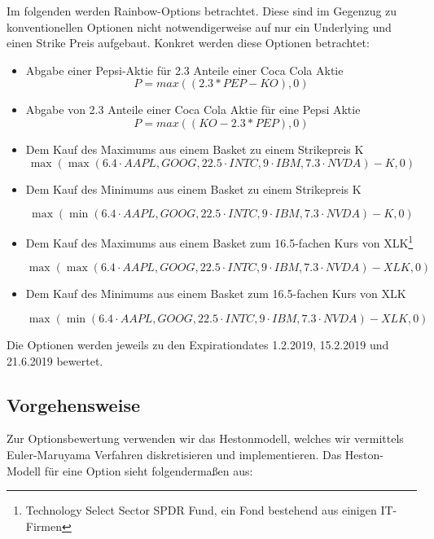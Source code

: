 \documentclass[12pt]{article}
\begin{document}
Im folgenden werden Rainbow-Options betrachtet. Diese sind im Gegenzug zu konventionellen Optionen nicht notwendigerweise auf nur ein Underlying und einen Strike Preis aufgebaut.
\newline
Konkret werden diese Optionen betrachtet:
\begin{itemize}
	\item Abgabe einer Pepsi-Aktie für 2.3 Anteile einer Coca Cola Aktie
		\begin{equation*}
	P=max((2.3*PEP-KO),0)
	\end{equation*}	
	\item Abgabe von 2.3 Anteile einer Coca Cola Aktie für eine Pepsi Aktie
	\begin{equation*}
	P=max((KO-2.3*PEP),0)
	\end{equation*}	
	\item Dem Kauf des Maximums aus einem Basket zu einem Strikepreis K
	\begin{equation*}
	\max(\max(6.4 \cdot AAPL,GOOG,22.5 \cdot INTC, 9 \cdot IBM, 7.3 \cdot NVDA)-K,0)
	\end{equation*}
	\item Dem Kauf des Minimums aus einem Basket zu einem Strikepreis K
	
	\begin{equation*}
	\max(\min(6.4 \cdot AAPL,GOOG,22.5 \cdot INTC, 9 \cdot IBM, 7.3 \cdot NVDA)-K,0)
	\end{equation*}
	\item Dem Kauf des Maximums aus einem Basket zum 16.5-fachen Kurs von XLK\footnote{Technology Select Sector SPDR Fund, ein Fond bestehend aus einigen IT-Firmen}
	
	\begin{equation*}
	\max(\max(6.4 \cdot AAPL,GOOG,22.5 \cdot INTC, 9 \cdot IBM, 7.3 \cdot NVDA)-XLK,0)
	\end{equation*}
	\item Dem Kauf des Minimums aus einem Basket zum 16.5-fachen Kurs von XLK
	
	\begin{equation*}
	\max(\min(6.4 \cdot AAPL,GOOG,22.5 \cdot INTC, 9 \cdot IBM, 7.3 \cdot NVDA)-XLK,0)
	\end{equation*}
	

\end{itemize}

Die Optionen werden jeweils zu den Expirationdates 1.2.2019, 15.2.2019 und 21.6.2019 bewertet.
\subsection*{Vorgehensweise}
Zur Optionsbewertung verwenden wir das Hestonmodell, welches wir vermittels Euler-Maruyama Verfahren diskretisieren und implementieren.
Das Heston-Modell für eine Option sieht folgendermaßen aus:
\end{document}
